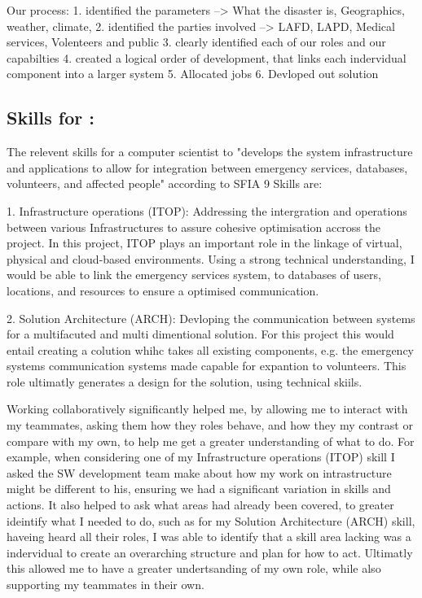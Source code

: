 \documentclass[a4paper, 11pt]{report}
\begin{document}
Our process:
1. identified the parameters --> What the disaster is, Geographics, weather, climate, 
2. identified the parties involved  --> LAFD, LAPD, Medical services, Volenteers and public 
3. clearly identified each of our roles and our capabilties 
4. created a logical order of development, that links each indervidual component into a larger system 
5. Allocated jobs
6. Devloped out solution 



\subsection{Skills for \majA: \studA}

The relevent skills for a computer scientist to "develops the system infrastructure and applications to allow for integration between emergency services, databases, volunteers, and affected people" according to SFIA 9 Skills are:

1. Infrastructure operations (ITOP): Addressing the intergration and operations between various Infrastructures to assure cohesive optimisation accross the project. In this project, ITOP plays an important role in the linkage of virtual, physical and cloud-based environments. Using a strong technical understanding, I  would be able to link the emergency services system, to databases of users, locations, and resources to ensure a optimised communication. 

2. Solution Architecture (ARCH): Devloping the communication between systems for a multifacuted and multi dimentional solution. For this project this would entail creating a colution whihc takes all existing components, e.g. the emergency systems communication systems made capable for expantion to volunteers. This role ultimatly generates a design for the solution, using technical skiils. 

Working collaboratively significantly helped me, by allowing me to interact with my teammates, asking them how they roles behave, and how they my contrast or compare with my own, to help me get a greater understanding of what to do. For example, when considering one of my Infrastructure operations (ITOP) skill I asked the SW development team make about how my work on intrastructure might be different to his, ensuring we had a significant variation in skills and actions. It also helped to ask what areas had already been covered, to greater ideintify what I needed to do, such as for my Solution Architecture (ARCH) skill, haveing heard all their roles, I was able to identify that a skill area lacking was a indervidual to create an overarching structure and plan for how to act. Ultimatly this allowed me to have a greater undertsanding of my own role, while also  supporting my teammates in their own. 
\end{document}
